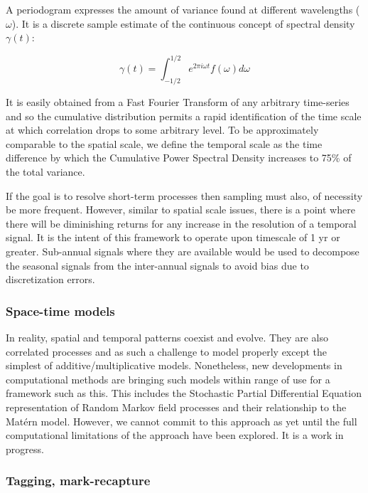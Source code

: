 \documentclass[letterpaper,portrait,11pt]{scrartcl}
\numberwithin{equation}{section}		%
\numberwithin{figure}{section}		%
\numberwithin{table}{section}				%
\begin{document}
A periodogram expresses the amount of variance found at different wavelengths ($\omega$). It is a discrete sample estimate of the continuous concept of spectral density $\gamma(t)$: 

\begin{equation}
  \label{eq:spectraldDensity}
  \gamma(t) = \int_{-1/2}^{1/2} e^{2\pi i \omega t} f(\omega) d \omega
\end{equation}

It is easily obtained from a Fast Fourier Transform of any arbitrary time-series and so the cumulative distribution permits a rapid identification of the time scale at which correlation drops to some arbitrary level. To be approximately comparable to the spatial scale, we define the temporal scale as the time difference by which the Cumulative Power Spectral Density increases to 75\% of the total variance.

If the goal is to resolve short-term processes then sampling must also, of necessity be more frequent. However, similar to spatial scale issues, there is a point where there will be diminishing returns for any increase in the resolution of a temporal signal. It is the intent of this framework to operate upon timescale of 1 yr or greater. Sub-annual signals where they are available would be used to decompose the seasonal signals from the inter-annual signals to avoid bias due to discretization errors. 

\subsubsection{Space-time models}

In reality, spatial and temporal patterns coexist and evolve. They are also correlated processes and as such a challenge to model properly except the simplest of additive/multiplicative models. Nonetheless, new developments in computational methods are bringing such models within range of use for a framework such as this. This includes the Stochastic Partial Differential Equation representation of Random Markov field processes and their relationship to the Mat\'{e}rn model. However, we cannot commit to this approach as yet until the full computational limitations of the approach have been explored. It is a work in progress.


\subsubsection{Tagging, mark-recapture}
\end{document}
